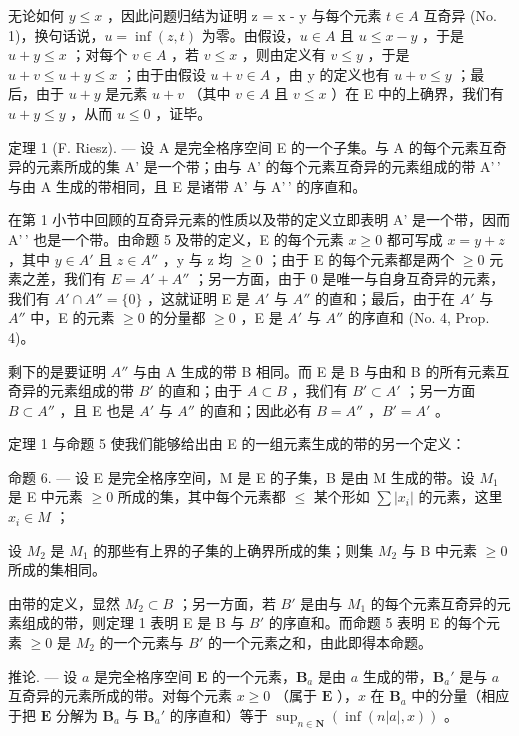 无论如何 \(y \leqslant x\) ，因此问题归结为证明 z = x - y 与每个元素 \(t \in A\) 互奇异 (No. 1)，换句话说，\(u = \inf(z, t)\) 为零。由假设，\(u \in A\) 且 \(u \leqslant x - y\) ，于是 \(u + y \leqslant x\) ；对每个 \(v \in A\) ，若 \(v \leqslant x\) ，则由定义有 \(v \leqslant y\) ，于是 \(u + v \leqslant u + y \leqslant x\) ；由于由假设 \(u + v \in A\) ，由 y 的定义也有 \(u + v \leqslant y\) ；最后，由于 \(u + y\) 是元素 \(u + v\) （其中 \(v \in A\) 且 \(v \leqslant x\) ）在 E 中的上确界，我们有 \(u + y \leqslant y\) ，从而 \(u \leqslant 0\) ，证毕。

定理 1 (F. Riesz). --- 设 A 是完全格序空间 E 的一个子集。与 A 的每个元素互奇异的元素所成的集 A' 是一个带；由与 A' 的每个元素互奇异的元素组成的带 A'\,' 与由 A 生成的带相同，且 E 是诸带 A' 与 A'\,' 的序直和。

在第 1 小节中回顾的互奇异元素的性质以及带的定义立即表明 A' 是一个带，因而 A'\,' 也是一个带。由命题 5 及带的定义，E 的每个元素 \(x \geqslant 0\) 都可写成 \(x = y + z\) ，其中 \(y \in A'\) 且 \(z \in A''\) ，y 与 z 均 \(\geqslant 0\) ；由于 E 的每个元素都是两个 \(\geqslant 0\) 元素之差，我们有 \(E = A' + A''\) ；另一方面，由于 0 是唯一与自身互奇异的元素，我们有 \(A' \cap A'' = \{0\}\) ，这就证明 E 是 \(A'\) 与 \(A''\) 的直和；最后，由于在 \(A'\) 与 \(A''\) 中，E 的元素 \(\geqslant 0\) 的分量都 \(\geqslant 0\) ，E 是 \(A'\) 与 \(A''\) 的序直和 (No. 4, Prop. 4)。

剩下的是要证明 \(A''\) 与由 A 生成的带 B 相同。而 E 是 B 与由和 B 的所有元素互奇异的元素组成的带 \(B'\) 的直和；由于 \(A \subset B\) ，我们有 \(B' \subset A'\) ；另一方面 \(B \subset A''\) ，且 E 也是 \(A'\) 与 \(A''\) 的直和；因此必有 \(B = A''\) ，\(B' = A'\) 。

定理 1 与命题 5 使我们能够给出由 E 的一组元素生成的带的另一个定义：

命题 6. --- 设 E 是完全格序空间，M 是 E 的子集，B 是由 M 生成的带。设 \(M_{1}\) 是 E 中元素 \(\geqslant 0\) 所成的集，其中每个元素都 \(\leqslant\) 某个形如 \(\sum |x_{i}|\) 的元素，这里 \(x_{i} \in M\) ；

设 \(M_{2}\) 是 \(M_{1}\) 的那些有上界的子集的上确界所成的集；则集 \(M_{2}\) 与 B 中元素 \(\geqslant0\) 所成的集相同。

由带的定义，显然 \(M_{2} \subset B\) ；另一方面，若 \(B'\) 是由与 \(M_{1}\) 的每个元素互奇异的元素组成的带，则定理 1 表明 E 是 B 与 \(B'\) 的序直和。而命题 5 表明 E 的每个元素 \(\geqslant 0\) 是 \(M_{2}\) 的一个元素与 \(B'\) 的一个元素之和，由此即得本命题。

推论. --- 设 \(a\) 是完全格序空间 \(\mathbf{E}\) 的一个元素，\(\mathbf{B}_a\) 是由 \(a\) 生成的带，\(\mathbf{B}_a'\) 是与 \(a\) 互奇异的元素所成的带。对每个元素 \(x \geqslant 0\) （属于 \(\mathbf{E}\) ），\(x\) 在 \(\mathbf{B}_a\) 中的分量（相应于把 \(\mathbf{E}\) 分解为 \(\mathbf{B}_a\) 与 \(\mathbf{B}_a'\) 的序直和）等于 \(\sup_{n \in \mathbf{N}} \left( \inf(n|a|, x) \right)\) 。

